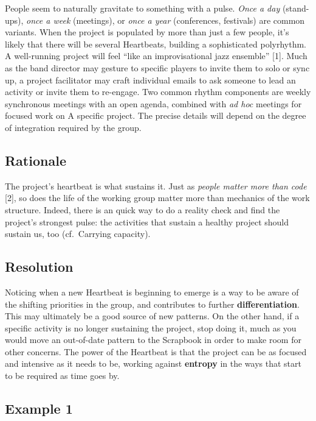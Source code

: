 People seem to naturally gravitate to something with a pulse. \emph{Once
a day} (stand-ups), \emph{once a week} (meetings), or \emph{once a year}
(conferences, festivals) are common variants. When the project is
populated by more than just a few people, it's likely that there will be
several {{Heartbeats}}, building a sophisticated polyrhythm. A
well-running project will feel ``like an improvisational jazz ensemble''
{{[}1{]}}. Much as the band director may gesture to specific players to
invite them to solo or sync up, a project facilitator may craft
individual emails to ask someone to lead an activity or invite them to
re-engage. Two common rhythm components are weekly synchronous meetings
with an open agenda, combined with \emph{ad hoc} meetings for focused
work on {{A specific project}}. The precise details will depend on the
degree of integration required by the group.

\hypertarget{rationale}{%
\subsection{Rationale}\label{rationale}}

The project's heartbeat is what sustains it. Just as \emph{people matter
more than code} {{[}2{]}}, so does the life of the working group matter
more than mechanics of the work structure. Indeed, there is an quick way
to do a reality check and find the project's strongest pulse: the
activities that sustain a healthy project should sustain us, too
(cf.~{{Carrying capacity}}).

\hypertarget{resolution}{%
\subsection{Resolution}\label{resolution}}

Noticing when a new {{Heartbeat}} is beginning to emerge is a way to be
aware of the shifting priorities in the group, and contributes to
further \textbf{differentiation}. This may ultimately be a good source
of new patterns. On the other hand, if a specific activity is no longer
sustaining the project, stop doing it, much as you would move an
out-of-date pattern to the {{Scrapbook}} in order to make room for other
concerns. The power of the {{Heartbeat}} is that the project can be as
focused and intensive as it needs to be, working against
\textbf{entropy} in the ways that start to be required as time goes by.

\hypertarget{example-1}{%
\subsection{Example 1}\label{example-1}}

